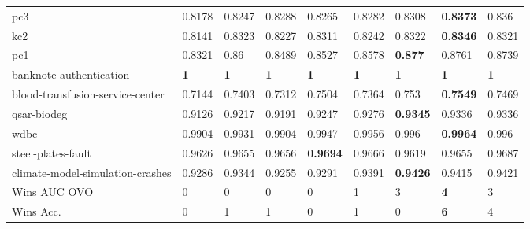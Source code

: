 \begin{tabular}{@{\hskip 0mm}
l@{\hskip 1mm}
l@{\hskip 1mm}
l@{\hskip 1mm}
l@{\hskip 1mm}
l@{\hskip 1mm}
l@{\hskip 1mm}
l@{\hskip 1mm}
l@{\hskip 1mm}
l@{\hskip 0mm}}
pc3                              &          0.8178 &          0.8247 &          0.8288 &           0.8265 &           0.8282 &           0.8308 &           \textbf{0.8373} &                     0.836 \\
kc2                              &          0.8141 &          0.8323 &          0.8227 &           0.8311 &           0.8242 &           0.8322 &           \textbf{0.8346} &                    0.8321 \\
pc1                              &          0.8321 &            0.86 &          0.8489 &           0.8527 &           0.8578 &   \textbf{0.877} &                    0.8761 &                    0.8739 \\
banknote-authentication          &      \textbf{1} &      \textbf{1} &      \textbf{1} &       \textbf{1} &       \textbf{1} &       \textbf{1} &                \textbf{1} &                \textbf{1} \\
blood-transfusion-service-center &          0.7144 &          0.7403 &          0.7312 &           0.7504 &           0.7364 &            0.753 &           \textbf{0.7549} &                    0.7469 \\
qsar-biodeg                      &          0.9126 &          0.9217 &          0.9191 &           0.9247 &           0.9276 &  \textbf{0.9345} &                    0.9336 &                    0.9336 \\
wdbc                             &          0.9904 &          0.9931 &          0.9904 &           0.9947 &           0.9956 &            0.996 &           \textbf{0.9964} &                     0.996 \\
steel-plates-fault               &          0.9626 &          0.9655 &          0.9656 &  \textbf{0.9694} &           0.9666 &           0.9619 &                    0.9655 &                    0.9687 \\
climate-model-simulation-crashes &          0.9286 &          0.9344 &          0.9255 &           0.9291 &           0.9391 &  \textbf{0.9426} &                    0.9415 &                    0.9421 \\
\midrule
Wins AUC OVO
                                                     &               0 &               0 &               0 &                0 &                1 &                3 &                \textbf{4} &                         3 \\
Wins Acc.                        &               0 &               1 &               1 &                0 &                1 &                0 &                \textbf{6} &                         4 \\

\end{tabular}
